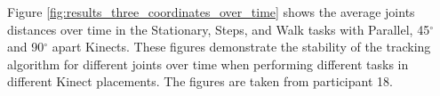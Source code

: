 Figure \ref{fig:results_three_coordinates_over_time} shows the average joints distances over time in the Stationary, Steps, and Walk tasks with Parallel, 45$^{\circ}$ and 90$^{\circ}$ apart Kinects. These figures demonstrate the stability of the tracking algorithm for different joints over time when performing different tasks in different Kinect placements. The figures are taken from participant 18.


\begin{figure}[!h]
  \centering

   \\
\end{figure}

